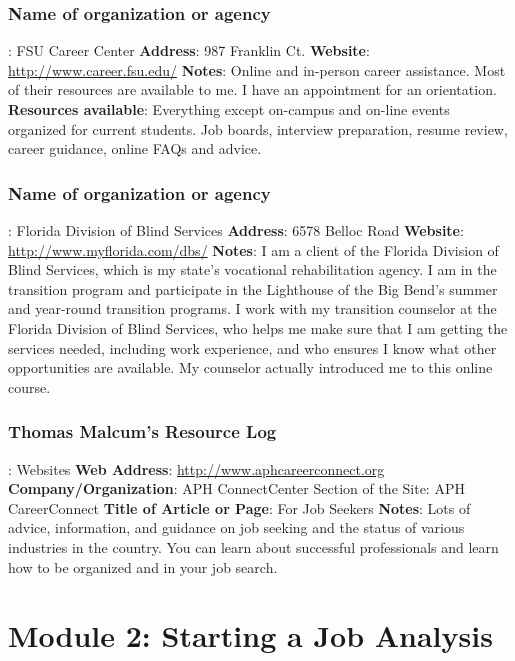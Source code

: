 \subsubsection*{Name of organization or agency}: FSU Career Center
\break \textbf{Address}: 987 Franklin Ct.
\break \textbf{Website}: \href{http://www.career.fsu.edu/}{http://www.career.fsu.edu/}
\break \textbf{Notes}: Online and in-person career assistance. Most of their resources are available to me. I have an appointment for an orientation.
\break \textbf{Resources available}: Everything except on-campus and on-line events organized for current students. Job boards, interview preparation, resume review, career guidance, online FAQs and advice.

\subsubsection*{Name of organization or agency}: Florida Division of Blind Services
\break \textbf{Address}: 6578 Belloc Road
\break \textbf{Website}: \href{http://www.myflorida.com/dbs/}{http://www.myflorida.com/dbs/}
\break \textbf{Notes}: I am a client of the Florida Division of Blind Services, which is my state's vocational rehabilitation agency. I am in the transition program and participate in the Lighthouse of the Big Bend's summer and year-round transition programs. I work with my transition counselor at the Florida Division of Blind Services, who helps me make sure that I am getting the services needed, including work experience, and who ensures I know what other opportunities are available. My counselor actually introduced me to this online course.

\subsubsection*{Thomas Malcum's Resource Log}: Websites
\break \textbf{Web Address}: \href{http://www.aphcareerconnect.org}{http://www.aphcareerconnect.org}
\break \textbf{Company/Organization}: APH ConnectCenter Section of the Site: APH CareerConnect
\break \textbf{Title of Article or Page}: For Job Seekers
\break \textbf{Notes}: Lots of advice, information, and guidance on job seeking and the status of various industries in the country. You can learn about successful professionals and learn how to be organized and in your job search.


\pagebreak \section*{Module 2:	Starting a Job Analysis}
\noindent\makebox[\textwidth]{\rule{\linewidth}{0.4pt}}
\localtableofcontents
\noindent\makebox[\textwidth]{\rule{\linewidth}{0.4pt}}


